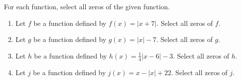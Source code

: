 \documentclass{ximera}
\author{Kenneth Berglund}
\begin{document}
\licenseSZ
\begin{exercise}
For each function, select all zeros of the given function.

\begin{enumerate}
\item Let $f$ be a function defined by $f(x) = |x + 7|$.
Select all zeros of $f$.
\begin{selectAll}
\end{selectAll}

\item Let $g$ be a function defined by $g(x) = |x| - 7$.
Select all zeros of $g$.
\begin{selectAll}
\end{selectAll}

\item Let $h$ be a function defined by $h(x) = \frac{1}{4}|x - 6| - 3$.
Select all zeros of $h$.
\begin{selectAll}
\end{selectAll}

\item Let $j$ be a function defined by $j(x) = x - |x| + 22$.
Select all zeros of $j$.
\begin{selectAll}
\end{selectAll}

\end{enumerate}

\end{exercise}
\end{document}
